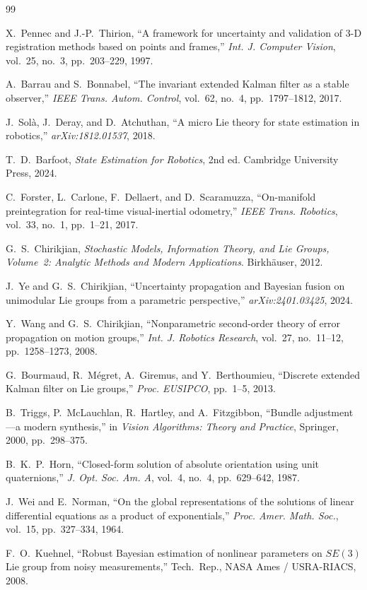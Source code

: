 \documentclass[journal]{IEEEtran}
\begin{document}
\begin{thebibliography}{99}

X.~Pennec and J.-P.~Thirion,
``A framework for uncertainty and validation of 3-D registration 
methods based on points and frames,''
\emph{Int. J. Computer Vision}, vol.~25, no.~3, pp.~203--229, 1997.

A.~Barrau and S.~Bonnabel,
``The invariant extended Kalman filter as a stable observer,''
\emph{IEEE Trans. Autom. Control}, vol.~62, no.~4, pp.~1797--1812, 2017.

J.~Sol\`{a}, J.~Deray, and D.~Atchuthan,
``A micro Lie theory for state estimation in robotics,''
\emph{arXiv:1812.01537}, 2018.

T.~D.~Barfoot,
\emph{State Estimation for Robotics}, 2nd ed.
Cambridge University Press, 2024.

C.~Forster, L.~Carlone, F.~Dellaert, and D.~Scaramuzza,
``On-manifold preintegration for real-time visual-inertial odometry,''
\emph{IEEE Trans. Robotics}, vol.~33, no.~1, pp.~1--21, 2017.

G.~S.~Chirikjian,
\emph{Stochastic Models, Information Theory, and Lie Groups, 
Volume~2: Analytic Methods and Modern Applications}.
Birkh\"{a}user, 2012.

J.~Ye and G.~S.~Chirikjian,
``Uncertainty propagation and Bayesian fusion on unimodular 
Lie groups from a parametric perspective,''
\emph{arXiv:2401.03425}, 2024.

Y.~Wang and G.~S.~Chirikjian,
``Nonparametric second-order theory of error propagation 
on motion groups,''
\emph{Int. J. Robotics Research}, vol.~27, no.~11--12, 
pp.~1258--1273, 2008.

G.~Bourmaud, R.~M\'{e}gret, A.~Giremus, and Y.~Berthoumieu,
``Discrete extended Kalman filter on Lie groups,''
\emph{Proc. EUSIPCO}, pp.~1--5, 2013.

B.~Triggs, P.~McLauchlan, R.~Hartley, and A.~Fitzgibbon,
``Bundle adjustment---a modern synthesis,''
in \emph{Vision Algorithms: Theory and Practice}, 
Springer, 2000, pp.~298--375.

B.~K.~P.~Horn,
``Closed-form solution of absolute orientation using unit 
quaternions,''
\emph{J. Opt. Soc. Am. A}, vol.~4, no.~4, pp.~629--642, 1987.

J.~Wei and E.~Norman,
``On the global representations of the solutions of linear 
differential equations as a product of exponentials,''
\emph{Proc. Amer. Math. Soc.}, vol.~15, pp.~327--334, 1964.

F.~O.~Kuehnel,
``Robust Bayesian estimation of nonlinear parameters on 
$SE(3)$ Lie group from noisy measurements,''
Tech.\ Rep., NASA Ames / USRA-RIACS, 2008.

\end{thebibliography}
\end{document}
